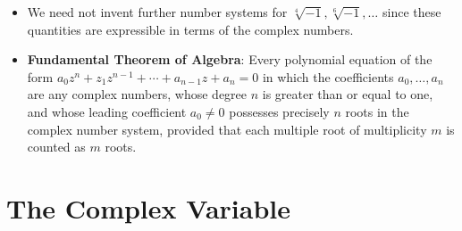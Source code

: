 \documentclass[../main.tex]{subfiles}
\begin{document}
\begin{itemize}
\begin{itemize}
    \end{itemize}
    \item We need not invent further number systems for $\sqrt[4]{-1},\sqrt[6]{-1},\dots$ since these quantities are expressible in terms of the complex numbers.
    \item \textbf{Fundamental Theorem of Algebra}: Every polynomial equation of the form $a_0z^n+z_1z^{n-1}+\cdots+a_{n-1}z+a_n=0$ in which the coefficients $a_0,\dots,a_n$ are any complex numbers, whose degree $n$ is greater than or equal to one, and whose leading coefficient $a_0\neq 0$ possesses precisely $n$ roots in the complex number system, provided that each multiple root of multiplicity $m$ is counted as $m$ roots.
\end{itemize}



\section{The Complex Variable}
\end{document}
